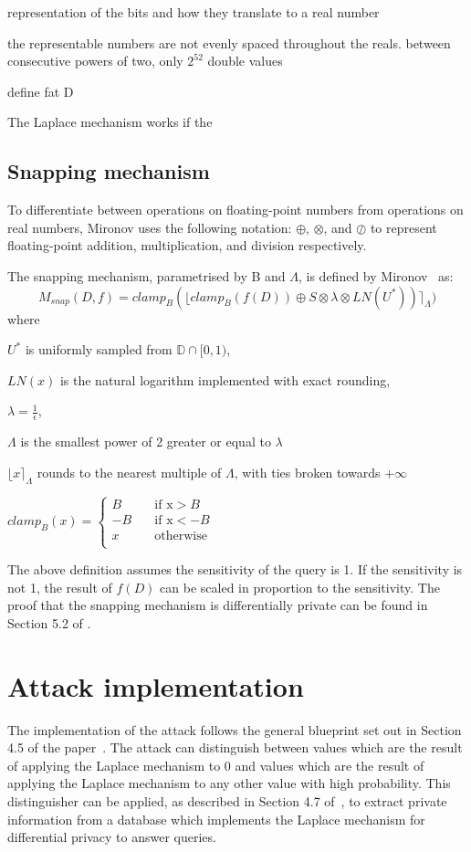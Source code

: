 \documentclass[orivec,envcountsame]{llncs}
\begin{document}
representation of the bits and how they translate to a real number

the representable numbers are not evenly spaced throughout the reals. between consecutive powers of two, only $2^{52}$ double values

define fat D

The Laplace mechanism works if the 

\cite{mironov2012significance}
\subsection{Snapping mechanism}
To differentiate between operations on floating-point numbers from operations on real numbers, Mironov uses the following notation: $\oplus$, $\otimes$, and $\oslash$ to represent floating-point addition, multiplication, and division respectively.

\begin{definition}
The snapping mechanism, parametrised by B and $\Lambda$, is defined by Mironov~\cite{mironov2012significance} as:
\large $$ M_{snap}(D, f) = clamp_B(\lfloor clamp_B(f(D)) \oplus S \otimes \lambda \otimes LN(U^*)) \rceil_\Lambda) $$
\normalsize where 

$U^*$ is uniformly sampled from $\mathbb{D} \cap [0, 1)$, 

$LN(x)$ is the natural logarithm implemented with exact rounding,

$\lambda = \frac{1}{\epsilon}$,

$\Lambda$ is the smallest power of 2 greater or equal to $\lambda$

$\lfloor x \rceil_\Lambda$ rounds to the nearest multiple of $\Lambda$, with ties broken towards $+\infty$ 

$clamp_B(x) =
\begin{cases}
    B &\quad\text{if x} > B \\
    -B &\quad\text{if x} < -B \\
    x &\quad\text{otherwise} \\ 
\end{cases} 
$
\end{definition}

The above definition assumes the sensitivity of the query is 1. If the sensitivity is not 1, the result of $f(D)$ can be scaled in proportion to the sensitivity. The proof that the snapping mechanism is differentially private can be found in Section 5.2 of \cite{mironov2012significance}.


\section{Attack implementation}
The implementation of the attack follows the general blueprint set out in Section 4.5 of the paper~\cite{mironov2012significance}. The attack can distinguish between values which are the result of applying the Laplace mechanism to 0 and values which are the result of applying the Laplace mechanism to any other value with high probability. This distinguisher can be applied, as described in Section 4.7 of~\cite{mironov2012significance}, to extract private information from a database which implements the Laplace mechanism for differential privacy to answer queries.
\end{document}
